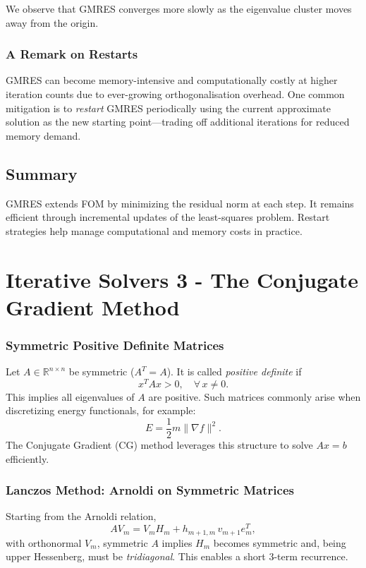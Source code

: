 \documentclass[11pt,a4paper]{book}
\begin{document}
We observe that GMRES converges more slowly as the eigenvalue cluster moves away from the origin.

\subsection*{A Remark on Restarts}
GMRES can become memory-intensive and computationally costly at higher iteration counts due to ever-growing orthogonalisation overhead. One common mitigation is to \emph{restart} GMRES periodically using the current approximate solution as the new starting point—trading off additional iterations for reduced memory demand.

\section*{Summary}
GMRES extends FOM by minimizing the residual norm at each step. It remains efficient through incremental updates of the least-squares problem. Restart strategies help manage computational and memory costs in practice.

\chapter{Iterative Solvers 3 - The Conjugate Gradient Method}

\subsection*{Symmetric Positive Definite Matrices}
Let \(A \in \mathbb{R}^{n \times n}\) be symmetric (\(A^T = A\)). It is called \emph{positive definite} if
\[
x^T A x > 0, \quad \forall\, x \neq 0.
\]
This implies all eigenvalues of \(A\) are positive. Such matrices commonly arise when discretizing energy functionals, for example:
\[
E = \frac{1}{2} m \|\nabla f\|^2.
\]
The Conjugate Gradient (CG) method leverages this structure to solve \(A x = b\) efficiently.

\subsection*{Lanczos Method: Arnoldi on Symmetric Matrices}
Starting from the Arnoldi relation,
\[
A V_m = V_m H_m + h_{m+1,m}\,v_{m+1}e_m^T,
\]
with orthonormal \(V_m\), symmetric \(A\) implies \(H_m\) becomes symmetric and, being upper Hessenberg, must be \emph{tridiagonal}. This enables a short 3-term recurrence.
\end{document}
